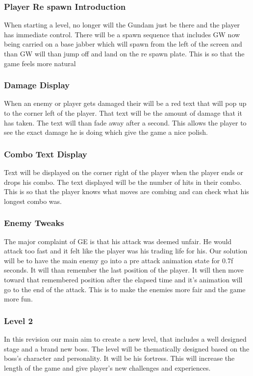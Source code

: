 \documentclass{article}
\begin{document}
\subsubsection*{Player Re spawn Introduction}
 When starting a level, no longer will the Gundam just be there and the player has immediate control. There will be a spawn sequence that includes GW now being carried on a base jabber which will spawn from the left of the screen and than GW will than jump off and land on the re spawn plate. This is so that the game feels more natural 

\subsubsection*{Damage Display}
When an enemy or player gets damaged their will be a red text that will pop up to the corner left of the player. That text will be the amount of damage that it has taken. The text will than fade away after a second. This allows the player to see the exact damage he is doing which give the game a nice polish.

\subsubsection*{Combo Text Display}
Text will be displayed on the corner right of the player when the player ends or drops his combo. The text displayed will be the number of hits in their combo. This is so that the player knows what moves are combing and can check what his longest combo was.  

\subsubsection*{Enemy Tweaks}
The major complaint of GE is that his attack was deemed unfair. He would attack too fast and it felt like the player was his trading life for his. Our solution will be to have the main enemy go into a pre attack animation state for 0.7f seconds. It will than remember the last position of the player. It will then move toward that remembered position after the elapsed time and it's animation will go to the end of the attack. This is to make the enemies more fair and the game more fun.

\subsubsection*{Level 2}
In this revision our main aim to create a new level, that includes a well designed stage and a brand new boss. The level will be thematically designed based on the boss's character and personality. It will be his fortress. This will increase the length of the game and give player's new challenges and experiences. 
\end{document}
